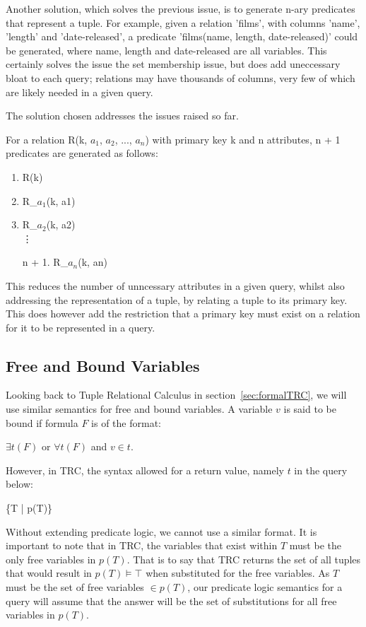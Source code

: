 \documentclass[a4paper, 11pt]{article}
\begin{document}
      Another solution, which solves the previous issue, is to generate n-ary
      predicates that represent a tuple. For example, given a relation 'films',
      with columns 'name', 'length' and 'date-released', a predicate
      'films(name, length, date-released)' could be generated, where name,
      length and date-released are all variables. This certainly solves the
      issue the set membership issue, but does add uneccessary bloat to each
      query; relations may have thousands of columns, very few of which are
      likely needed in a given query.

      The solution chosen addresses the issues raised so far.

      For a relation R(k, $a_{1}$, $a_{2}$, ..., $a_{n}$) with primary key k
      and n attributes, n + 1 predicates are generated as follows:
      \begin{enumerate}
        \item R(k)
        \item R\_$a_{1}$(k, a1)
        \item R\_$a_{2}$(k, a2)
        \\ \vdots
        \item[n + 1.] R\_$a_{n}$(k, an)
      \end{enumerate}

      This reduces the number of unncessary attributes in a given query, whilst
      also addressing the representation of a tuple, by relating a tuple to its
      primary key. This does however add the restriction that a primary key
      must exist on a relation for it to be represented in a query.

    \subsection{Free and Bound Variables}

      Looking back to Tuple Relational Calculus in
      section~\ref{sec:formalTRC}, we will use similar semantics for free and
      bound variables. A variable $v$ is said to be bound if formula $F$ is of
      the format:

      $\exists t(F)$ or $\forall t(F)$ and $v \in t$.

      However, in TRC, the syntax allowed for a return value, namely $t$ in the
      query below:

      \{T | p(T)\}

      Without extending predicate logic, we cannot use a similar format.
      It is important to note that in TRC, the variables that exist
      within $T$ must be the only free variables in $p(T)$. That is to say that
      TRC returns the set of all tuples that would result in $p(T) \models
      \top$ when substituted for the free variables. As $T$ must be the set of
      free variables $\in p(T)$, our predicate logic semantics for a query will
      assume that the answer will be the set of substitutions for all free
      variables in $p(T)$.
\end{document}

